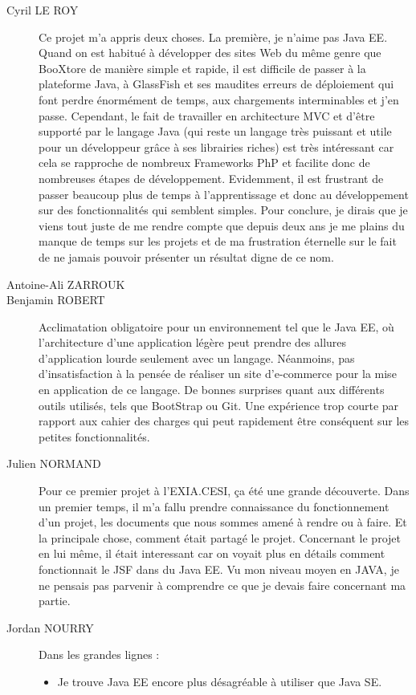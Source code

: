 \begin{description}
	\item[Cyril LE ROY]
	Ce projet m’a appris deux choses.
	La première, je n’aime pas Java EE. Quand on est habitué à développer des sites Web du même genre que BooXtore de manière simple et rapide, il est difficile de passer à la plateforme Java, à GlassFish et ses maudites erreurs de déploiement qui font perdre énormément de temps, aux chargements interminables et j’en passe.
	Cependant, le fait de travailler en architecture MVC et d’être supporté par le langage Java (qui reste un langage très puissant et utile pour un développeur grâce à ses librairies riches) est très intéressant car cela se rapproche de nombreux Frameworks PhP et facilite donc de nombreuses étapes de développement.
	Evidemment, il est frustrant de passer beaucoup plus de temps à l’apprentissage et donc au développement sur des fonctionnalités qui semblent simples.
	Pour conclure, je dirais que je viens tout juste de me rendre compte que depuis deux ans je me plains du manque de temps sur les projets et de ma frustration éternelle sur le fait de ne jamais pouvoir présenter un résultat digne de ce nom.
	\item[Antoine-Ali ZARROUK]
	\item[Benjamin ROBERT]
	Acclimatation obligatoire pour un environnement tel que le Java EE, où l'architecture d'une application légère peut prendre des allures d'application lourde seulement avec un langage.
	Néanmoins, pas d'insatisfaction à la pensée de réaliser un site d'e-commerce pour la mise en application de ce langage. De bonnes surprises quant aux différents outils utilisés, tels que BootStrap ou Git. Une expérience trop courte par rapport aux cahier des charges qui peut rapidement être conséquent sur les petites fonctionnalités.
	\item[Julien NORMAND]
	Pour ce premier projet à l'EXIA.CESI, ça été une grande découverte. Dans un premier temps, il m'a fallu prendre connaissance du fonctionnement d'un projet, les documents que nous sommes amené à rendre ou à faire. Et la principale chose, comment était partagé le projet.
	Concernant le projet en lui même, il était interessant car on voyait plus en détails comment fonctionnait le JSF dans du Java EE. Vu mon niveau moyen en JAVA, je ne pensais pas parvenir à comprendre ce que je devais faire concernant ma partie.
	\item[Jordan NOURRY]
	Dans les grandes lignes :
		\begin{itemize}
			\item Je trouve Java EE encore plus désagréable à utiliser que Java SE.

\end{itemize}
\end{description}
